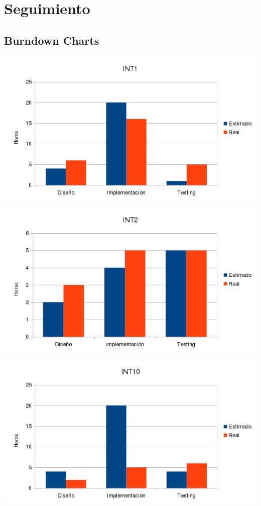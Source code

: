 \section{Seguimiento}

  

  \subsection{Burndown Charts}

    \includegraphics[width=1\textwidth]{img/Hint1.png}

    \includegraphics[width=1\textwidth]{img/Hint2.png}

    \includegraphics[width=1\textwidth]{img/Hint10.png}

